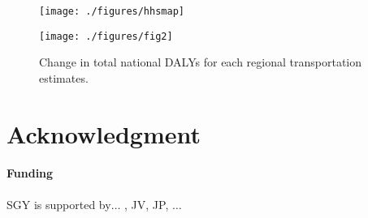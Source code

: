 \documentclass{bioinfo}
\begin{document}
\begin{figure}[t]
    \centerline{\texttt{[image: ./figures/hhsmap]}}\centerline{\texttt{[image: ./figures/fig2]}}
    \caption{Change in total national DALYs for each regional transportation
estimates.
}\label{dalyFigure}
\end{figure}

\section*{Acknowledgment}

\paragraph{Funding\textcolon} SGY is supported by$\ldots$ , JV, JP, $\ldots$

%
%


\end{document}
